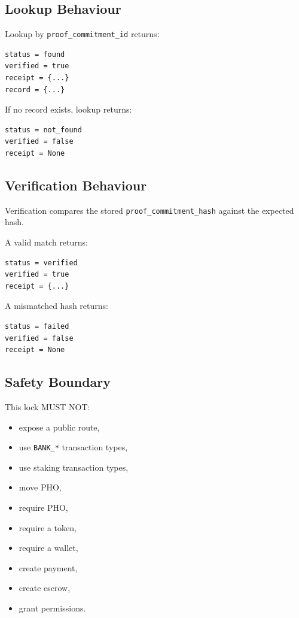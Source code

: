 \subsection{Lookup Behaviour}

Lookup by \texttt{proof\_commitment\_id} returns:

\begin{verbatim}
status = found
verified = true
receipt = {...}
record = {...}
\end{verbatim}

If no record exists, lookup returns:

\begin{verbatim}
status = not_found
verified = false
receipt = None
\end{verbatim}

\subsection{Verification Behaviour}

Verification compares the stored \texttt{proof\_commitment\_hash} against the expected hash.

A valid match returns:

\begin{verbatim}
status = verified
verified = true
receipt = {...}
\end{verbatim}

A mismatched hash returns:

\begin{verbatim}
status = failed
verified = false
receipt = None
\end{verbatim}

\subsection{Safety Boundary}

This lock MUST NOT:

\begin{itemize}
  \item expose a public route,
  \item use \texttt{BANK\_*} transaction types,
  \item use staking transaction types,
  \item move PHO,
  \item require PHO,
  \item require a token,
  \item require a wallet,
  \item create payment,
  \item create escrow,
  \item grant permissions.
\end{itemize}

